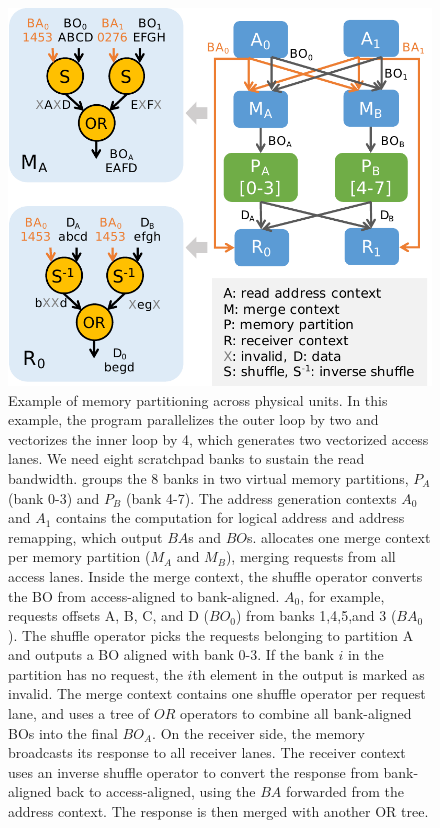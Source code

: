 \begin{figure}
  \centering
  \includegraphics[width=0.6\columnwidth]{figs/memsplit2.pdf}
  \caption[Memory partitioning]{Example of memory partitioning across physical units. In this example, the program parallelizes the outer loop by two and vectorizes the inner loop by 4, which generates two vectorized access lanes. We need eight scratchpad banks to sustain the read bandwidth. 
  \name groups the 8 banks in two virtual memory partitions, $P_A$ (bank 0-3) and $P_B$ (bank 4-7). The address generation contexts $A_0$ and $A_1$ contains the computation for logical address and address remapping, which output $BA$s and $BO$s. \name allocates one merge context per memory partition
  ($M_A$ and $M_B$),
  merging requests from all access lanes. Inside the merge context, the shuffle operator converts the BO from access-aligned to bank-aligned. $A_0$, for example, requests offsets 
  A, B, C, and D ($BO_0$) from banks 1,4,5,and 3 ($BA_0$). The shuffle operator picks the requests belonging to partition A and outputs a BO aligned with bank 0-3. If the bank $i$ in the partition has no request, the $i$th element in the output is marked as invalid.
  The merge context contains one shuffle operator per request lane, and uses a tree of $OR$
  operators to combine all bank-aligned BOs into the final $BO_A$.
  On the receiver side, the memory broadcasts its response to all receiver lanes.
  The receiver context uses an inverse shuffle operator to convert the response from bank-aligned back to access-aligned, using the $BA$ forwarded from the address context. The response is then merged with another OR tree. 
  }
  \label{fig:memsplit}
\end{figure}

